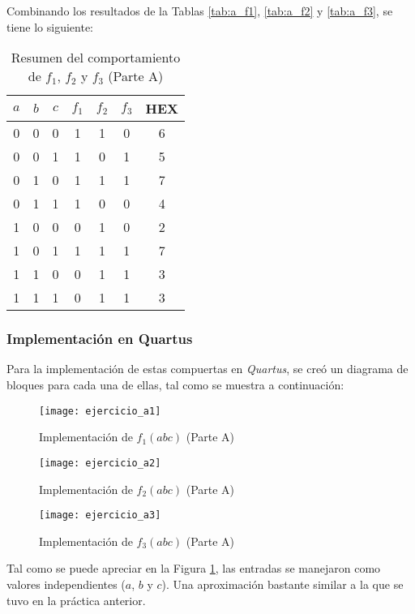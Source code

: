 \documentclass[../procedimientos.tex]{subfiles}
\begin{document}
Combinando los resultados de la Tablas \ref{tab:a_f1}, \ref{tab:a_f2} y 
\ref{tab:a_f3}, se tiene lo siguiente:
\begin{table}[H]
  \centering
  \begin{tabular}{ccc|ccc|c}
    \hline
    $a$ & $b$ & $c$ & $f_1$ & $f_2$ & $f_3$ & HEX\\
    \hline
    0 & 0 & 0 & 1 & 1 & 0 & 6\\
    0 & 0 & 1 & 1 & 0 & 1 & 5\\
    0 & 1 & 0 & 1 & 1 & 1 & 7\\
    0 & 1 & 1 & 1 & 0 & 0 & 4\\
    1 & 0 & 0 & 0 & 1 & 0 & 2\\
    1 & 0 & 1 & 1 & 1 & 1 & 7\\
    1 & 1 & 0 & 0 & 1 & 1 & 3\\
    1 & 1 & 1 & 0 & 1 & 1 & 3\\
    \hline
  \end{tabular}
  \caption{Resumen del comportamiento de $f_1$, $f_2$ y $f_3$ (Parte A)}
  \label{tab:a_summary}
\end{table}

\subsubsection{Implementación en Quartus}\label{subs:a_imp}
Para la implementación de estas compuertas en \textit{Quartus}, se creó un 
diagrama de bloques para cada una de ellas, tal como se muestra a 
continuación:
\begin{figure}[H]
  \texttt{[image: ejercicio\_a1]}
  \caption{Implementación de $f_1(abc)$ (Parte A)}
  \label{fig:a_f1}
\end{figure}
\begin{figure}[H]
  \texttt{[image: ejercicio\_a2]}
  \caption{Implementación de $f_2(abc)$ (Parte A)}
  \label{fig:a_f2}
\end{figure}
\begin{figure}[H]
  \texttt{[image: ejercicio\_a3]}
  \caption{Implementación de $f_3(abc)$ (Parte A)}
  \label{fig:a_f3}
\end{figure}

Tal como se puede apreciar en la Figura \ref{fig:a_f1}, las entradas se 
manejaron como valores independientes ($a$, $b$ y $c$). Una aproximación 
bastante similar a la que se tuvo en la práctica anterior.
\end{document}
